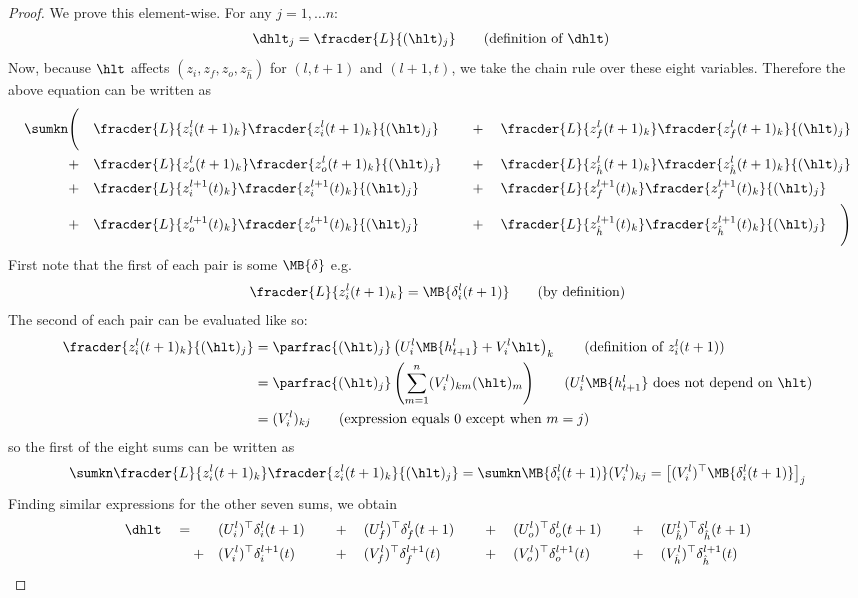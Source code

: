 \begin{proof}
We prove this element-wise. For any $j=1,\dots n$:
\begin{align}
\dhlt_j = \fracder{L}{(\hlt)_j}  & \tag{definition of $\dhlt$} 
\end{align}
Now, because $\hlt$ affects $(z_i,z_f,z_o,z_{\hat{h}})$ for $(l,t+1)$ and $(l+1,t)$, we take the chain rule over these eight variables. Therefore the above equation can be written as
\begin{alignat*}{2}
\sumkn  \Bigg( \quad 
& \fracder{L}{z_i^l(t+1)_k} \fracder{z_i^l(t+1)_k}{(\hlt)_j}    
\quad 
&& + \quad \fracder{L}{z_f^l(t+1)_k} \fracder{z_f^l(t+1)_k}{(\hlt)_j}
\\
+ \quad &  \fracder{L}{z_o^l(t+1)_k} \fracder{z_o^l(t+1)_k}{(\hlt)_j} 
\quad 
&& + \quad \fracder{L}{z_{\hat{h}}^l(t+1)_k} \fracder{z_{\hat{h}}^l(t+1)_k}{(\hlt)_j}
\\
+ \quad  & \fracder{L}{z_i^{l+1}(t)_k} \fracder{z_i^{l+1}(t)_k}{(\hlt)_j} 
\quad 
&& + \quad \fracder{L}{z_f^{l+1}(t)_k} \fracder{z_f^{l+1}(t)_k}{(\hlt)_j} 
\\
+ \quad & \fracder{L}{z_o^{l+1}(t)_k} \fracder{z_o^{l+1}(t)_k}{(\hlt)_j} 
\quad
&& + \quad \fracder{L}{z_{\hat{h}}^{l+1}(t)_k} \fracder{z_{\hat{h}}^{l+1}(t)_k}{(\hlt)_j} 
\quad  \Bigg)
\end{alignat*}
First note that the first of each pair is some $\MB{\delta}$ e.g.
\begin{align}
\fracder{L}{z_i^l(t+1)_k}= \MB{\delta_i^l(t+1)} \tag{by definition}
\end{align}
The second of each pair can be evaluated like so: 
\begin{align}
\fracder{z_i^l(t+1)_k}{(\hlt)_j} &= \parfrac{(\hlt)_j} \left( U_i^l \MB{h_{t+1}^l} + V_i^l \hlt \right)_k \tag{definition of $z_i^l(t+1)$} \\
&= \parfrac{(\hlt)_j} \left( \sum_{m=1}^n (V_i^l)_{km} (\hlt)_m \right) \tag{$U_i^l \MB{h_{t+1}^l} $ does not depend on $\hlt$} \\
&= (V_i^l)_{kj} \tag{expression equals 0 except when $m=j$}
\end{align}
so the first of the eight sums can be written as 
\begin{align}
\sumkn \fracder{L}{z_i^l(t+1)_k} \fracder{z_i^l(t+1)_k}{(\hlt)_j} = 
\sumkn  \MB{\delta_i^l(t+1)} (V_i^l)_{kj} =
\left[ (V_i^l)^\top \MB{\delta_i^l(t+1)} \right]_j
\end{align}
Finding similar expressions for the other seven sums, we obtain
\begin{alignat*}{4}
\dhlt \quad = \quad \quad 
&(U_i^l)^\top \delta_i^l(t+1) \quad
&&+ \quad (U_f^l)^\top \delta_f^l(t+1) \quad 
&&+ \quad (U_o^l)^\top \delta_o^l(t+1) \quad
&&+ \quad (U_{\hat{h}}^l)^\top \delta_{\hat{h}}^l(t+1) \\
+ \quad &(V_i^l)^\top \delta_i^{l+1}(t)
&&+ \quad (V_f^l)^\top \delta_f^{l+1}(t)
&&+ \quad (V_o^l)^\top \delta_o^{l+1}(t)
&&+ \quad (V_{\hat{h}}^l)^\top \delta_{\hat{h}}^{l+1}(t)
\end{alignat*}
\end{proof}

